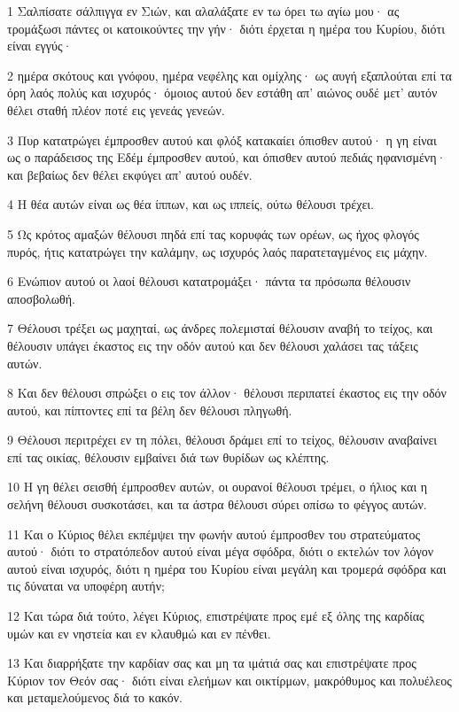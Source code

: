 \par 1 Σαλπίσατε σάλπιγγα εν Σιών, και αλαλάξατε εν τω όρει τω αγίω μου· ας τρομάξωσι πάντες οι κατοικούντες την γήν· διότι έρχεται η ημέρα του Κυρίου, διότι είναι εγγύς·
\par 2 ημέρα σκότους και γνόφου, ημέρα νεφέλης και ομίχλης· ως αυγή εξαπλούται επί τα όρη λαός πολύς και ισχυρός· όμοιος αυτού δεν εστάθη απ' αιώνος ουδέ μετ' αυτόν θέλει σταθή πλέον ποτέ εις γενεάς γενεών.
\par 3 Πυρ κατατρώγει έμπροσθεν αυτού και φλόξ κατακαίει όπισθεν αυτού· η γη είναι ως ο παράδεισος της Εδέμ έμπροσθεν αυτού, και όπισθεν αυτού πεδιάς ηφανισμένη· και βεβαίως δεν θέλει εκφύγει απ' αυτού ουδέν.
\par 4 Η θέα αυτών είναι ως θέα ίππων, και ως ιππείς, ούτω θέλουσι τρέχει.
\par 5 Ως κρότος αμαξών θέλουσι πηδά επί τας κορυφάς των ορέων, ως ήχος φλογός πυρός, ήτις κατατρώγει την καλάμην, ως ισχυρός λαός παρατεταγμένος εις μάχην.
\par 6 Ενώπιον αυτού οι λαοί θέλουσι κατατρομάξει· πάντα τα πρόσωπα θέλουσιν αποσβολωθή.
\par 7 Θέλουσι τρέξει ως μαχηταί, ως άνδρες πολεμισταί θέλουσιν αναβή το τείχος, και θέλουσιν υπάγει έκαστος εις την οδόν αυτού και δεν θέλουσι χαλάσει τας τάξεις αυτών.
\par 8 Και δεν θέλουσι σπρώξει ο εις τον άλλον· θέλουσι περιπατεί έκαστος εις την οδόν αυτού, και πίπτοντες επί τα βέλη δεν θέλουσι πληγωθή.
\par 9 Θέλουσι περιτρέχει εν τη πόλει, θέλουσι δράμει επί το τείχος, θέλουσιν αναβαίνει επί τας οικίας, θέλουσιν εμβαίνει διά των θυρίδων ως κλέπτης.
\par 10 Η γη θέλει σεισθή έμπροσθεν αυτών, οι ουρανοί θέλουσι τρέμει, ο ήλιος και η σελήνη θέλουσι συσκοτάσει, και τα άστρα θέλουσι σύρει οπίσω το φέγγος αυτών.
\par 11 Και ο Κύριος θέλει εκπέμψει την φωνήν αυτού έμπροσθεν του στρατεύματος αυτού· διότι το στρατόπεδον αυτού είναι μέγα σφόδρα, διότι ο εκτελών τον λόγον αυτού είναι ισχυρός, διότι η ημέρα του Κυρίου είναι μεγάλη και τρομερά σφόδρα και τις δύναται να υποφέρη αυτήν;
\par 12 Και τώρα διά τούτο, λέγει Κύριος, επιστρέψατε προς εμέ εξ όλης της καρδίας υμών και εν νηστεία και εν κλαυθμώ και εν πένθει.
\par 13 Και διαρρήξατε την καρδίαν σας και μη τα ιμάτιά σας και επιστρέψατε προς Κύριον τον Θεόν σας· διότι είναι ελεήμων και οικτίρμων, μακρόθυμος και πολυέλεος και μεταμελούμενος διά το κακόν.
